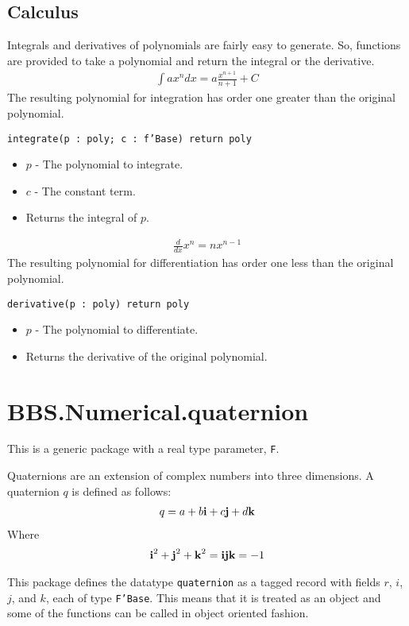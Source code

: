 \documentclass[10pt, openany]{book}
\newcommand{\function}[1]{\texttt{#1}}
\newcommand{\datatype}[1]{\texttt{#1}}
\newcommand{\uvec}[1]{\textnormal{\bfseries{#1}}}
\begin{document}
\subsection{Calculus}
Integrals and derivatives of polynomials are fairly easy to generate.  So, functions are provided to take a polynomial and return the integral or the derivative.
\begin{align*}
  \int ax^n dx = a\frac{x^{n+1}}{n+1}+C
\end{align*}
The resulting polynomial for integration has order one greater than the original polynomial.

\function{integrate(p : poly; c : f'Base) return poly}
\begin{itemize}
  \item $p$ - The polynomial to integrate.
  \item $c$ - The constant term.
  \item Returns the integral of $p$.
\end{itemize}

\begin{align*}
  \frac{d}{dx}x^n = n x^{n-1}
\end{align*}
The resulting polynomial for differentiation has order one less than the original polynomial.

\function{derivative(p : poly) return poly}
\begin{itemize}
  \item $p$ - The polynomial to differentiate.
  \item Returns the derivative of the original polynomial.
\end{itemize}

\section{BBS.Numerical.quaternion}
This is a generic package with a real type parameter, \datatype{F}.

Quaternions are an extension of complex numbers into three dimensions.  A quaternion $q$ is defined as follows:
\begin{align*}
  q=a+b\uvec{i}+c\uvec{j}+d\uvec{k}
\end{align*}
Where
\begin{align*}
  \uvec{i}^2+\uvec{j}^2+\uvec{k}^2=\uvec{i}\uvec{j}\uvec{k}=-1
\end{align*}

This package defines the datatype \datatype{quaternion} as a tagged record with fields $r$, $i$, $j$, and $k$, each of type \datatype{F'Base}.  This means that it is treated as an object and some of the functions can be called in object oriented fashion.
\end{document}
